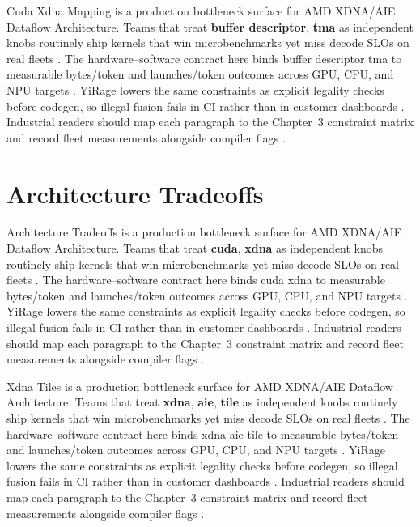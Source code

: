 Cuda Xdna Mapping is a production bottleneck surface for AMD XDNA/AIE Dataflow Architecture. Teams that treat \textbf{buffer descriptor}, \textbf{tma} as independent knobs routinely ship kernels that win microbenchmarks yet miss decode SLOs on real fleets \citep{nvidia2022hopper,amd2024aie}. The hardware--software contract here binds buffer descriptor tma to measurable bytes/token and launches/token outcomes across GPU, CPU, and NPU targets \citep{semianalysis2024tma,dlbook}. YiRage lowers the same constraints as explicit legality checks before codegen, so illegal fusion fails in CI rather than in customer dashboards \citep{amd2024xdna,dao2022flashattention}. Industrial readers should map each paragraph to the Chapter~3 constraint matrix and record fleet measurements alongside compiler flags \citep{amd2024aie,kwon2023vllm}.

\section{Architecture Tradeoffs}
\label{sec:architecture_tradeoffs}

Architecture Tradeoffs is a production bottleneck surface for AMD XDNA/AIE Dataflow Architecture. Teams that treat \textbf{cuda}, \textbf{xdna} as independent knobs routinely ship kernels that win microbenchmarks yet miss decode SLOs on real fleets \citep{semianalysis2024tma,dlbook}. The hardware--software contract here binds cuda xdna to measurable bytes/token and launches/token outcomes across GPU, CPU, and NPU targets \citep{amd2024xdna,dao2022flashattention}. YiRage lowers the same constraints as explicit legality checks before codegen, so illegal fusion fails in CI rather than in customer dashboards \citep{amd2024aie,kwon2023vllm}. Industrial readers should map each paragraph to the Chapter~3 constraint matrix and record fleet measurements alongside compiler flags \citep{dlbook,nvidia2024cudagraphs}.

Xdna Tiles is a production bottleneck surface for AMD XDNA/AIE Dataflow Architecture. Teams that treat \textbf{xdna}, \textbf{aie}, \textbf{tile} as independent knobs routinely ship kernels that win microbenchmarks yet miss decode SLOs on real fleets \citep{memoryfloor2026,amd2024xdna}. The hardware--software contract here binds xdna aie tile to measurable bytes/token and launches/token outcomes across GPU, CPU, and NPU targets \citep{nvidia2022hopper,amd2024aie}. YiRage lowers the same constraints as explicit legality checks before codegen, so illegal fusion fails in CI rather than in customer dashboards \citep{semianalysis2024tma,dlbook}. Industrial readers should map each paragraph to the Chapter~3 constraint matrix and record fleet measurements alongside compiler flags \citep{amd2024xdna,dao2022flashattention}.

